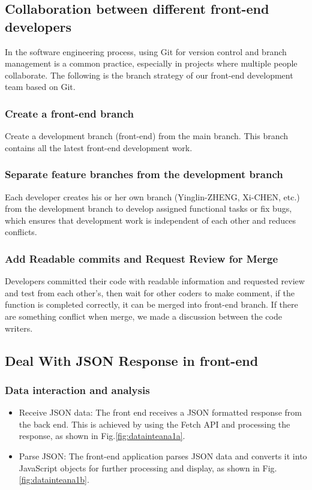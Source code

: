 \documentclass[journal]{IEEEtran}
\begin{document}
\subsection{Collaboration between different front-end developers}
In the software engineering process, using Git for version control and branch management is a common practice, especially in projects where multiple people collaborate. The following is the branch strategy of our front-end development team based on Git.
\subsubsection{Create a front-end branch}
Create a development branch (front-end) from the main branch. This branch contains all the latest front-end development work.
\subsubsection{Separate feature branches from the development branch}
Each developer creates his or her own branch (Yinglin-ZHENG, Xi-CHEN, etc.) from the development branch to develop assigned functional tasks or fix bugs, which ensures that development work is independent of each other and reduces conflicts.
\subsubsection{Add Readable commits and Request Review for Merge}
Developers committed their code with readable information and requested review and test from each other's, then wait for other coders to make comment, if the function is completed correctly, it can be merged into front-end branch. If there are something conflict when merge, we made a discussion between the code writers.

\subsection{Deal With JSON Response in front-end}
\subsubsection{Data interaction and analysis}
\begin{itemize}
  \item Receive JSON data: The front end receives a JSON formatted response from the back end. This is achieved by using the Fetch API and processing the response, as shown in Fig.\ref{fig:datainteana1a}.
  \item Parse JSON: The front-end application parses JSON data and converts it into JavaScript objects for further processing and display, as shown in Fig.\ref{fig:datainteana1b}.
\end{itemize}
\end{document}
